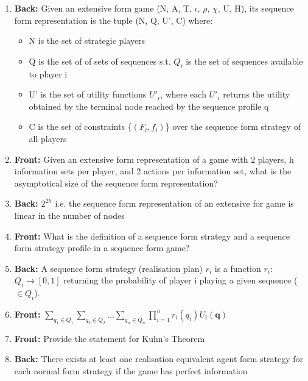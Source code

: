 \documentclass{article}
\begin{document}
\begin{enumerate}
    \item \textbf{Back:} Given an extensive form game (N, A, T, $\iota$, $\rho$, $\chi$, U, H), its sequence form representation is the tuple (N, Q, U', C) where:\newline
    \begin{itemize}
        \item N is the set of strategic players
        \item Q is the set of of sets of sequences s.t. $Q_i$ is the set of sequences available to player i
        \item U' is the set of utility functions $U'_i$, where each $U'_i$ returns the utility obtained by the terminal node reached by the sequence profile q
        \item C is the set of constraints \{$(F_i, f_i)$\} over the sequence form strategy of all players
    \end{itemize}\newpage
    \item \textbf{Front:} Given an extensive form representation of a game with 2 players, h information sets per player, and 2 actions per information set, what is the asymptotical size of the sequence form representation?\newpage
    \item \textbf{Back:} $2^{2h}$ i.e. the sequence form representation of an extensive for game is linear in the number of nodes\newpage
    \item \textbf{Front:} What is the definition of a sequence form strategy and a sequence form strategy profile in a sequence form game?\newpage
    \item \textbf{Back:} A sequence form strategy (realisation plan) $r_i$ is a function $r_i$: $Q_i \rightarrow [0,1]$ returning the probability of player i playing a given sequence ($\in Q_i$).\newline
    \item \textbf{Front:} $\sum_{q_1 \in Q_1}\sum_{q_2 \in Q_2}...\sum_{q_n \in Q_n}\prod_{i = 1}^{n} r_i(q_i) U_i(\textbf{q})$   
    \item \textbf{Front:} Provide the statement for Kuhn's Theorem\newpage
    \item \textbf{Back:} There exists at least one realisation equivalent agent form strategy for each normal form strategy if the game has perfect information
    \end{enumerate}
\end{document}
